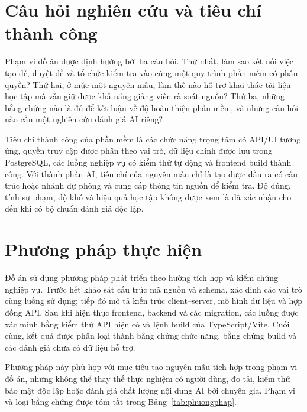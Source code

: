 \section{Câu hỏi nghiên cứu và tiêu chí thành công}

Phạm vi đồ án được định hướng bởi ba câu hỏi. Thứ nhất, làm sao kết nối việc
tạo đề, duyệt đề và tổ chức kiểm tra vào cùng một quy trình phần mềm có phân
quyền? Thứ hai, ở mức một nguyên mẫu, làm thế nào hỗ trợ khai thác tài liệu
học tập mà vẫn giữ được khả năng giảng viên rà soát nguồn? Thứ ba, những
bằng chứng nào là đủ để kết luận về độ hoàn thiện phần mềm, và những câu hỏi
nào cần một nghiên cứu đánh giá AI riêng?

Tiêu chí thành công của phần mềm là các chức năng trọng tâm có API/UI tương
ứng, quyền truy cập được phân theo vai trò, dữ liệu chính được lưu trong
PostgreSQL, các luồng nghiệp vụ có kiểm thử tự động và frontend build
thành công. Với thành phần AI, tiêu chí của nguyên mẫu chỉ là tạo được đầu
ra có cấu trúc hoặc nhánh dự phòng và cung cấp thông tin nguồn để kiểm tra.
Độ đúng, tính sư phạm, độ khó và hiệu quả học tập không được xem là đã xác
nhận cho đến khi có bộ chuẩn đánh giá độc lập.

\section{Phương pháp thực hiện}

Đồ án sử dụng phương pháp phát triển theo hướng tích hợp và kiểm chứng
nghiệp vụ. Trước hết khảo sát cấu trúc mã nguồn và schema, xác định các vai
trò cùng luồng sử dụng; tiếp đó mô tả kiến trúc client--server, mô hình dữ
liệu và hợp đồng API. Sau khi hiện thực frontend, backend và các migration,
các luồng được xác minh bằng kiểm thử API hiện có và lệnh build của
TypeScript/Vite. Cuối cùng, kết quả được phân loại thành bằng chứng chức
năng, bằng chứng build và các đánh giá chưa có dữ liệu hỗ trợ.

Phương pháp này phù hợp với mục tiêu tạo nguyên mẫu tích hợp trong phạm vi
đồ án, nhưng không thể thay thế thực nghiệm có người dùng, đo tải, kiểm thử
bảo mật độc lập hoặc đánh giá chất lượng nội dung AI bởi chuyên gia. Phạm
vi và loại bằng chứng được tóm tắt trong Bảng~\ref{tab:phuongphap}.

